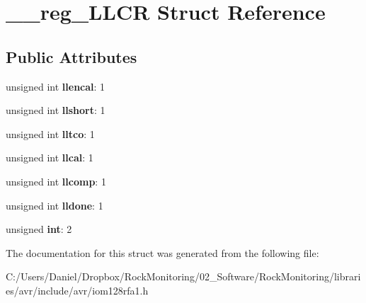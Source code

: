 \hypertarget{struct____reg___l_l_c_r}{}\section{\+\_\+\+\_\+reg\+\_\+\+L\+L\+CR Struct Reference}
\label{struct____reg___l_l_c_r}
\subsection*{Public Attributes}
\begin{DoxyCompactItemize}
\item 
unsigned int {\bfseries llencal}\+: 1\hypertarget{struct____reg___l_l_c_r_aba752208bcd0353113e38f860b045b55}{}\label{struct____reg___l_l_c_r_aba752208bcd0353113e38f860b045b55}

\item 
unsigned int {\bfseries llshort}\+: 1\hypertarget{struct____reg___l_l_c_r_ac8f76a3ab58a471f81546666d9fffa23}{}\label{struct____reg___l_l_c_r_ac8f76a3ab58a471f81546666d9fffa23}

\item 
unsigned int {\bfseries lltco}\+: 1\hypertarget{struct____reg___l_l_c_r_a5a2445dcee868eceda111315f7af4200}{}\label{struct____reg___l_l_c_r_a5a2445dcee868eceda111315f7af4200}

\item 
unsigned int {\bfseries llcal}\+: 1\hypertarget{struct____reg___l_l_c_r_a16dcdfb5fd72895e4635cdc5e0921a45}{}\label{struct____reg___l_l_c_r_a16dcdfb5fd72895e4635cdc5e0921a45}

\item 
unsigned int {\bfseries llcomp}\+: 1\hypertarget{struct____reg___l_l_c_r_a10fb4b0fab09dca2cb84754b050f8988}{}\label{struct____reg___l_l_c_r_a10fb4b0fab09dca2cb84754b050f8988}

\item 
unsigned int {\bfseries lldone}\+: 1\hypertarget{struct____reg___l_l_c_r_a04526e37abb05ac862510a05d97b975a}{}\label{struct____reg___l_l_c_r_a04526e37abb05ac862510a05d97b975a}

\item 
unsigned {\bfseries int}\+: 2\hypertarget{struct____reg___l_l_c_r_a76524be7295b2d42145e65d0b4105adc}{}\label{struct____reg___l_l_c_r_a76524be7295b2d42145e65d0b4105adc}

\end{DoxyCompactItemize}


The documentation for this struct was generated from the following file\+:\begin{DoxyCompactItemize}
\item 
C\+:/\+Users/\+Daniel/\+Dropbox/\+Rock\+Monitoring/02\+\_\+\+Software/\+Rock\+Monitoring/libraries/avr/include/avr/iom128rfa1.\+h\end{DoxyCompactItemize}
